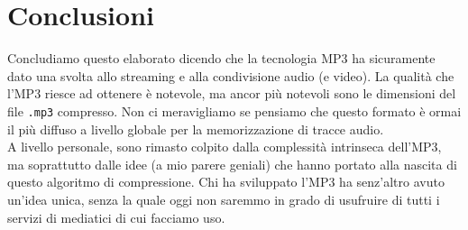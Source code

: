\chapter*{Conclusioni}
	
	Concludiamo questo elaborato dicendo che la tecnologia MP3 ha sicuramente dato una svolta allo streaming e alla condivisione audio (e video). La qualità che l'MP3 riesce ad ottenere è notevole, ma ancor più notevoli sono le dimensioni del file \texttt{.mp3} compresso. Non ci meravigliamo se pensiamo che questo formato è ormai il più diffuso a livello globale per la memorizzazione di tracce audio.\\
	A livello personale, sono rimasto colpito dalla complessità intrinseca dell'MP3, ma soprattutto dalle idee (a mio parere geniali) che hanno portato alla nascita di questo algoritmo di compressione. Chi ha sviluppato l'MP3 ha senz'altro avuto un'idea unica, senza la quale oggi non saremmo in grado di usufruire di tutti i servizi di mediatici di cui facciamo uso.
	